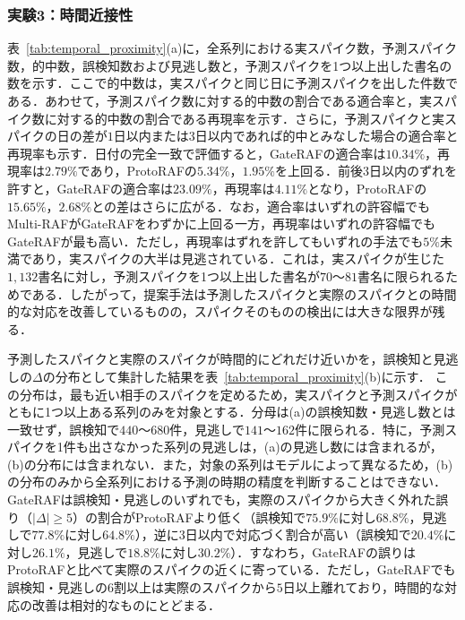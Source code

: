 \documentclass[twocolumn, lastpage]{jarticle}
\newif\ifrevmark
\newcommand{\revA}[1]{\ifrevmark{\color{blue}#1}\else#1\fi}
\newcommand{\revB}[1]{\ifrevmark{\color{red}#1}\else#1\fi}
\begin{document}
\subsubsection{実験3：時間近接性}
\revB{表~\ref{tab:temporal_proximity}(a)に，全系列における実スパイク数，予測スパイク数，的中数，誤検知数および見逃し数と，予測スパイクを1つ以上出した書名の数を示す．ここで的中数は，実スパイクと同じ日に予測スパイクを出した件数である．あわせて，予測スパイク数に対する的中数の割合である適合率と，実スパイク数に対する的中数の割合である再現率を示す．さらに，予測スパイクと実スパイクの日の差が$1$日以内または$3$日以内であれば的中とみなした場合の適合率と再現率も示す．日付の完全一致で評価すると，GateRAFの適合率は$10.34\%$，再現率は$2.79\%$であり，ProtoRAFの$5.34\%$，$1.95\%$を上回る．前後$3$日以内のずれを許すと，GateRAFの適合率は$23.09\%$，再現率は$4.11\%$となり，ProtoRAFの$15.65\%$，$2.68\%$との差はさらに広がる．なお，適合率はいずれの許容幅でもMulti-RAFがGateRAFをわずかに上回る一方，再現率はいずれの許容幅でもGateRAFが最も高い．ただし，再現率はずれを許してもいずれの手法でも$5\%$未満であり，実スパイクの大半は見逃されている．これは，実スパイクが生じた$1{,}132$書名に対し，予測スパイクを1つ以上出した書名が$70$〜$81$書名に限られるためである．したがって，提案手法は予測したスパイクと実際のスパイクとの時間的な対応を改善しているものの，スパイクそのものの検出には大きな限界が残る．}

予測したスパイクと実際のスパイクが時間的にどれだけ近いかを，誤検知と見逃しの$\Delta$の分布として集計した結果を表~\ref{tab:temporal_proximity}\revB{(b)}に示す．
\revB{この分布は，最も近い相手のスパイクを定めるため，実スパイクと予測スパイクがともに1つ以上ある系列のみを対象とする．分母は(a)の誤検知数・見逃し数とは一致せず，誤検知で$440$〜$680$件，見逃しで$141$〜$162$件に限られる．特に，予測スパイクを1件も出さなかった系列の見逃しは，(a)の見逃し数には含まれるが，(b)の分布には含まれない．また，対象の系列はモデルによって異なるため，(b)の分布のみから全系列における予測の時期の精度を判断することはできない．}
GateRAFは誤検知・見逃しのいずれでも，実際のスパイクから大きく外れた誤り（\revA{$|\Delta| \geq 5$}）の割合がProtoRAFより低く\revA{（誤検知で$75.9\%$に対し$68.8\%$，見逃しで$77.8\%$に対し$64.8\%$）}，逆に$3$日以内で対応づく割合が高い\revA{（誤検知で$20.4\%$に対し$26.1\%$，見逃しで$18.8\%$に対し$30.2\%$）}．すなわち，\revA{GateRAFの誤りはProtoRAFと比べて実際のスパイクの近くに寄っている．ただし，GateRAFでも誤検知・見逃しの6割以上は実際のスパイクから$5$日以上離れており，時間的な対応の改善は相対的なものにとどまる．}
\end{document}
